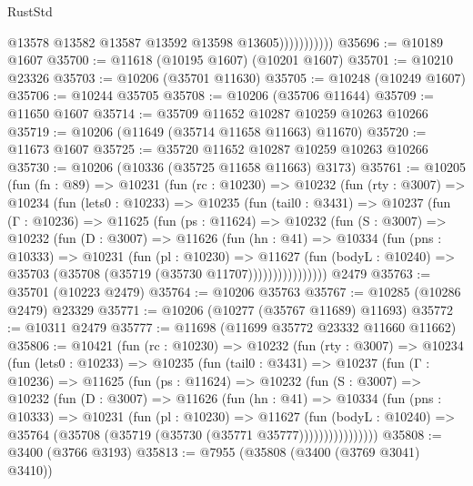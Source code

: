\begin{lexlean}{RustStd}
\begin{coremodule}
                          @13578
                          @13582
                          @13587
                          @13592
                          @13598
                          @13605)))))))))))
@35696 := @10189 @1607
@35700 := @11618 (@10195 @1607) (@10201 @1607)
@35701 := @10210 @23326
@35703 := @10206 (@35701 @11630)
@35705 := @10248 (@10249 @1607)
@35706 := @10244 @35705
@35708 := @10206 (@35706 @11644)
@35709 := @11650 @1607
@35714 := @35709 @11652 @10287 @10259 @10263 @10266
@35719 := @10206 (@11649 (@35714 @11658 @11663) @11670)
@35720 := @11673 @1607
@35725 := @35720 @11652 @10287 @10259 @10263 @10266
@35730 := @10206 (@10336 (@35725 @11658 @11663) @3173)
@35761 := @10205
    (fun (fn : @89) =>
    @10231
      (fun (rc : @10230) =>
      @10232
        (fun (rty : @3007) =>
        @10234
          (fun (lets0 : @10233) =>
          @10235
            (fun (tail0 : @3431) =>
            @10237
              (fun (Γ : @10236) =>
              @11625
                (fun (ps : @11624) =>
                @10232
                  (fun (S : @3007) =>
                  @10232
                    (fun (D : @3007) =>
                    @11626
                      (fun (hn : @41) =>
                      @10334
                        (fun (pns : @10333) =>
                        @10231
                          (fun (pl : @10230) =>
                          @11627
                            (fun (bodyL : @10240) =>
                            @35703 (@35708 (@35719 (@35730 @11707))))))))))))))))
    @2479
@35763 := @35701 (@10223 @2479)
@35764 := @10206 @35763
@35767 := @10285 (@10286 @2479) @23329
@35771 := @10206 (@10277 (@35767 @11689) @11693)
@35772 := @10311 @2479
@35777 := @11698 (@11699 @35772 @23332 @11660 @11662)
@35806 := @10421
    (fun (rc : @10230) =>
    @10232
      (fun (rty : @3007) =>
      @10234
        (fun (lets0 : @10233) =>
        @10235
          (fun (tail0 : @3431) =>
          @10237
            (fun (Γ : @10236) =>
            @11625
              (fun (ps : @11624) =>
              @10232
                (fun (S : @3007) =>
                @10232
                  (fun (D : @3007) =>
                  @11626
                    (fun (hn : @41) =>
                    @10334
                      (fun (pns : @10333) =>
                      @10231
                        (fun (pl : @10230) =>
                        @11627
                          (fun (bodyL : @10240) =>
                          @35764 (@35708 (@35719 (@35730 (@35771 @35777))))))))))))))))
@35808 := @3400 (@3766 @3193)
@35813 := @7955 (@35808 (@3400 (@3769 @3041) @3410))

\end{coremodule}
\end{lexlean}
